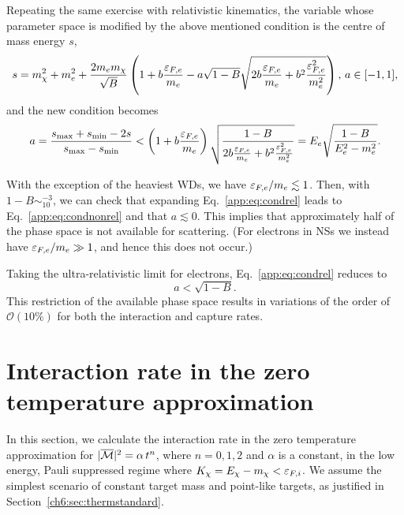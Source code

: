 Repeating the same exercise with relativistic kinematics, 
the variable whose parameter space is modified by the above mentioned condition is the centre of mass energy $s$,
\begin{equation}
s = m_\chi^2+m_e^2+\frac{2m_em_\chi}{\sqrt{B}}\left(1+b\frac{\varepsilon_{F,e}}{m_e}-a\sqrt{1-B}\sqrt{2b\frac{\varepsilon_{F,e}}{m_e}+b^2\frac{\varepsilon_{F,e}^2}{m_e^2}}\right), \,  a\in[-1,1], 
\end{equation}
and the new condition becomes
\begin{equation}
a= \frac{s_\mathrm{max}+s_\mathrm{min}-2s}{s_\mathrm{max}-s_\mathrm{min}} <\left(1+b\frac{\varepsilon_{F,e}}{m_e}\right)\sqrt{\frac{1-B}{2b\frac{\varepsilon_{F,e}}{m_e}+b^2\frac{\varepsilon_{F,e}^2}{m_e^2}}}
= E_e\sqrt{\frac{1-B}{E_e^2-m_e^2}}.\label{app:eq:condrel}
\end{equation}


With the exception of the heaviest WDs, we have $\varepsilon_{F,e}/m_e\lesssim 1$. Then, with $1-B\sim_10^{-3}$, we can check that expanding Eq.~\ref{app:eq:condrel} leads to Eq.~\ref{app:eq:condnonrel} and that $a\lesssim 0$.
This implies that approximately half of the phase space is not available for scattering. (For electrons in NSs we instead have $\varepsilon_{F,e}/m_e\gg1$, and hence this does not occur.) 

Taking the ultra-relativistic limit for electrons, Eq.~\ref{app:eq:condrel} reduces to
\begin{equation}
a <\sqrt{1-B}\label{app:eq:condurel}.
\end{equation}
This restriction of the available phase space results in variations of the order of $\mathcal{O}(10\%)$ for both the interaction and capture rates.

\section{Interaction rate in the zero temperature approximation}
\label{app:sec:int_low_temp}

In this section,  we calculate the interaction rate in the zero temperature approximation for $|\overline{\mathcal M}|^2 = \alpha \, t^n$, where $n=0,1,2$ and $\alpha$ is a constant, in the low energy, Pauli suppressed regime where $K_\chi=E_\chi-m_\chi<\varepsilon_{F,i}$. 
We assume the simplest scenario of constant target mass and point-like targets, as justified in Section~\ref{ch6:sec:thermstandard}.



